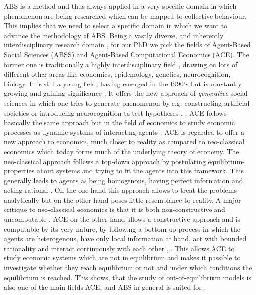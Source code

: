 ABS is a method and thus always applied in a very specific domain in which phenomenon are being researched which can be mapped to collective behaviour. This implies that we need to select a specific domain in which we want to advance the methodology of ABS. Being a vastly diverse, and inherently interdisciplinary research domain \cite{niazi_agent-based_2011}, for our PhD we pick the fields of Agent-Based Social Sciences (ABSS) and Agent-Based Computational Economics (ACE). The former one is traditionally a highly interdisciplinary field \cite{axelrod_chapter_2006}, drawing on lots of different other areas like economics, epidemology, genetics, neurocognition, biology. It is still a young field, having emerged in the 1990's but is constantly growing and gaining significance \cite{axelrod_advancing_1997}. It offers the new approach of \textit{generative} social sciences in which one tries to generate phenomenon by e.g. constructing artificial societies or introducing neurocognition to test hypotheses \cite{epstein_growing_1996}, \cite{epstein_agent_zero:_2014}.
ACE follows basically the same approach but in the field of economics to study economic processes as dynamic systems of interacting agents \cite{tesfatsion_agent-based_2006}. ACE is regarded to offer a new approach to economics, much closer to reality as compared to neo-classical economics which today forms much of the underlying theory of economy. The neo-classical approach follows a top-down approach by postulating equilibrium-properties about systems and trying to fit the agents into this framework. This generally leads to agents as being homogenous, having perfect information and acting rational \cite{kirman_complex_2010}. On the one hand this approach allows to treat the problems analytically but on the other hand poses little resemblance to reality. A major critique to neo-classical economics is that it is both non-constructive and uncomputable \cite{velupillai_unreasonable_2005}.
ACE on the other hand allows a constructive approach and is computable by its very nature, by following a bottom-up process in which the agents are heterogenous, have only local information at hand, act with bounded rationality and interact continuously with each other \cite{tesfatsion_modeling_2017}, \cite{kirman_complex_2010}. This allows ACE to study economic systems which are not in equilibrium and makes it possible to investigate whether they reach equilibrium or not and under which conditions the equilibrium is reached. This shows, that the study of out-of-equilibrium models is also one of the main fields ACE, and ABS in general is suited for \cite{epstein_generative_2012}.

